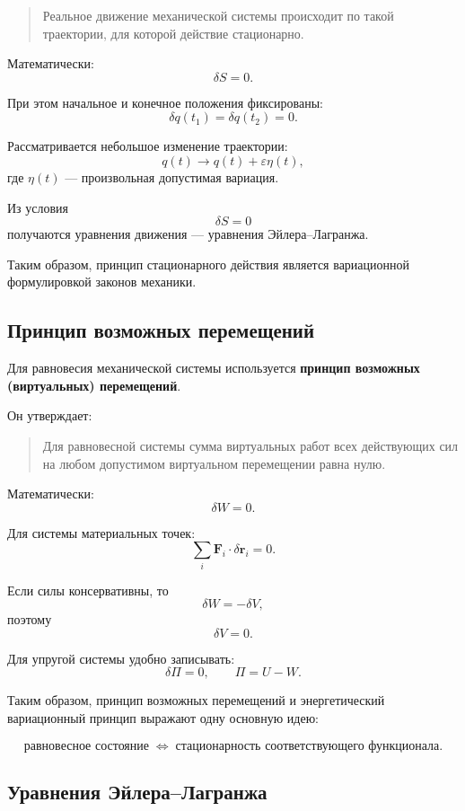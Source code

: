 \begin{quote}
	Реальное движение механической системы происходит по такой траектории,
	для которой действие стационарно.
\end{quote}

Математически:
\[
\boxed{\delta S=0}.
\]

При этом начальное и конечное положения фиксированы:
\[
\delta q(t_1)=\delta q(t_2)=0.
\]

Рассматривается небольшое изменение траектории:
\[
q(t)\rightarrow q(t)+\varepsilon\eta(t),
\]
где $\eta(t)$ --- произвольная допустимая вариация.

Из условия
\[
\delta S=0
\]
получаются уравнения движения --- уравнения Эйлера--Лагранжа.

Таким образом, принцип стационарного действия является вариационной
формулировкой законов механики.

\subsection{Принцип возможных перемещений}

Для равновесия механической системы используется
\textbf{принцип возможных (виртуальных) перемещений}.

Он утверждает:

\begin{quote}
	Для равновесной системы сумма виртуальных работ всех действующих сил
	на любом допустимом виртуальном перемещении равна нулю.
\end{quote}

Математически:
\[
\boxed{\delta W=0}.
\]

Для системы материальных точек:
\[
\sum_i \mathbf F_i\cdot\delta\mathbf r_i=0.
\]

Если силы консервативны, то
\[
\delta W=-\delta V,
\]
поэтому
\[
\delta V=0.
\]

Для упругой системы удобно записывать:
\[
\boxed{\delta\Pi=0},
\qquad
\Pi=U-W.
\]

Таким образом, принцип возможных перемещений и энергетический
вариационный принцип выражают одну основную идею:

\[
\boxed{
	\text{равновесное состояние}
	\;\Longleftrightarrow\;
	\text{стационарность соответствующего функционала}.
}
\]

\subsection{Уравнения Эйлера--Лагранжа}

